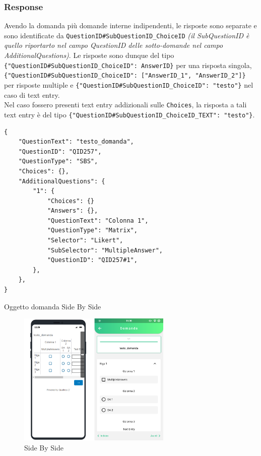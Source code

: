 \subsubsection{Response}
Avendo la domanda più domande interne indipendenti, le risposte sono separate e sono identificate da \texttt{QuestionID\#SubQuestionID\_ChoiceID} \textit{(il SubQuestionID è quello riportarto nel campo QuestionID delle sotto-domande nel campo AdditionalQuestions)}. Le risposte sono dunque del tipo\\ \texttt{\{"QuestionID\#SubQuestionID\_ChoiceID": AnswerID\}} per una risposta singola, \texttt{\{"QuestionID\#SubQuestionID\_ChoiceID": ["AnswerID\_1", "AnswerID\_2"]\}}\\ per risposte multiple e \texttt{\{"QuestionID\#SubQuestionID\_ChoiceID": "testo"\}} nel caso di text entry. \\
Nel caso fossero presenti text entry addizionali sulle \texttt{Choices}, la risposta a tali text entry è del tipo \texttt{\{"QuestionID\#SubQuestionID\_ChoiceID\_TEXT": "testo"\}}.

\newpage
\begin{json}
\begin{verbatim}
{
    "QuestionText": "testo_domanda",
    "QuestionID": "QID257",
    "QuestionType": "SBS",
    "Choices": {},
    "AdditionalQuestions": {
        "1": {
            "Choices": {}
            "Answers": {},
            "QuestionText": "Colonna 1",
            "QuestionType": "Matrix",
            "Selector": "Likert",
            "SubSelector": "MultipleAnswer",
            "QuestionID": "QID257#1",
        },
    },
}
\end{verbatim}
\caption{Oggetto domanda Side By Side}
\label{json:sbs}
\end{json}

\begin{figure}[h!]
\centering
\includegraphics[width=0.65\textwidth]{img/sbs}
\caption{Side By Side}
\label{fig:sbs}
\end{figure}

